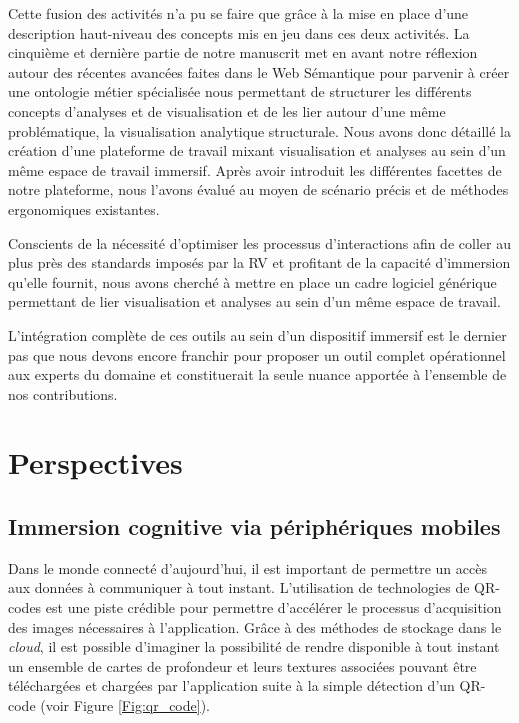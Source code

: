 Cette fusion des activités n'a pu se faire que grâce à la mise en place d'une description haut-niveau des concepts mis en jeu dans ces deux activités. La cinquième et dernière partie de notre manuscrit met en avant notre réflexion autour des récentes avancées faites dans le Web Sémantique pour parvenir à créer une ontologie métier spécialisée nous permettant de structurer les différents concepts d'analyses et de visualisation et de les lier autour d'une même problématique, la visualisation analytique structurale.
Nous avons donc détaillé la création d'une plateforme de travail mixant visualisation et analyses au sein d'un même espace de travail immersif. Après avoir introduit les différentes facettes de notre plateforme, nous l'avons évalué au moyen de scénario précis et de méthodes ergonomiques existantes.

Conscients de la nécessité d'optimiser les processus d'interactions afin de coller au plus près des standards imposés par la RV et profitant de la capacité d'immersion qu'elle fournit, nous avons cherché à mettre en place un cadre logiciel générique permettant de lier visualisation et analyses au sein d'un même espace de travail.



L'intégration complète de ces outils au sein d'un dispositif immersif est le dernier pas que nous devons encore franchir pour proposer un outil complet opérationnel aux experts du domaine et constituerait la seule nuance apportée à l'ensemble de nos contributions.




\section*{Perspectives}

\subsection{Immersion cognitive via périphériques mobiles}

Dans le monde connecté d'aujourd'hui, il est important de permettre un accès aux données à communiquer à tout instant. L'utilisation de technologies de QR-codes est une piste crédible pour permettre d'accélérer le processus d'acquisition des images nécessaires à l'application. Grâce à des méthodes de stockage dans le \textit{cloud}, il est possible d'imaginer la possibilité de rendre disponible à tout instant un ensemble de cartes de profondeur et leurs textures associées pouvant être téléchargées et chargées par l'application suite à la simple détection d'un QR-code (voir Figure \ref{Fig:qr_code}).

